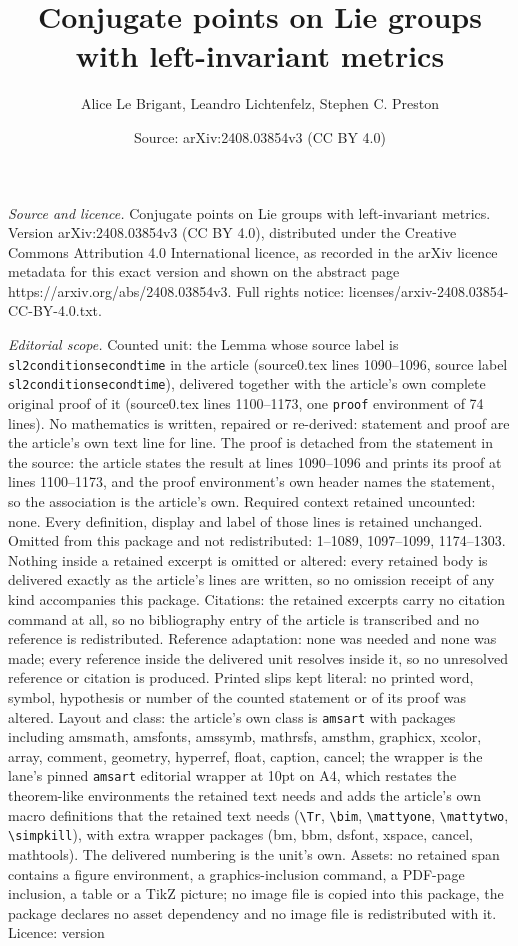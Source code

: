 \documentclass[10pt,a4paper]{amsart}
\title[Conjugate points on Lie groups with left-invariant metrics]{Conjugate points on Lie groups with left-invariant metrics}
\author{Alice Le Brigant, Leandro Lichtenfelz, Stephen C. Preston}
\date{Source: arXiv:2408.03854v3 (CC BY 4.0)}
\begin{document}
\maketitle

\noindent\emph{Source and licence.} Conjugate points on Lie groups with left-invariant metrics. Version arXiv:2408.03854v3 (CC BY 4.0), distributed under the Creative Commons Attribution 4.0 International licence, as recorded in the arXiv licence metadata for this exact version and shown on the abstract page https://arxiv.org/abs/2408.03854v3. Full rights notice: licenses/arxiv-2408.03854-CC-BY-4.0.txt.\par\smallskip

\noindent\textit{Editorial scope.} Counted unit: the Lemma whose source label is \texttt{sl2conditionsecondtime} in the article (source0.tex lines 1090--1096, source label \texttt{sl2conditionsecondtime}), delivered together with the article's own complete original proof of it (source0.tex lines 1100--1173, one \texttt{proof} environment of 74 lines). No mathematics is written, repaired or re-derived: statement and proof are the article's own text line for line. The proof is detached from the statement in the source: the article states the result at lines 1090--1096 and prints its proof at lines 1100--1173, and the proof environment's own header names the statement, so the association is the article's own. Required context retained uncounted: none. Every definition, display and label of those lines is retained unchanged. Omitted from this package and not redistributed: 1--1089, 1097--1099, 1174--1303. Nothing inside a retained excerpt is omitted or altered: every retained body is delivered exactly as the article's lines are written, so no omission receipt of any kind accompanies this package. Citations: the retained excerpts carry no citation command at all, so no bibliography entry of the article is transcribed and no reference is redistributed. Reference adaptation: none was needed and none was made; every reference inside the delivered unit resolves inside it, so no unresolved reference or citation is produced. Printed slips kept literal: no printed word, symbol, hypothesis or number of the counted statement or of its proof was altered. Layout and class: the article's own class is \texttt{amsart} with packages including amsmath, amsfonts, amssymb, mathrsfs, amsthm, graphicx, xcolor, array, comment, geometry, hyperref, float, caption, cancel; the wrapper is the lane's pinned \texttt{amsart} editorial wrapper at 10pt on A4, which restates the theorem-like environments the retained text needs and adds the article's own macro definitions that the retained text needs (\texttt{\textbackslash Tr}, \texttt{\textbackslash bim}, \texttt{\textbackslash mattyone}, \texttt{\textbackslash mattytwo}, \texttt{\textbackslash simpkill}), with extra wrapper packages (bm, bbm, dsfont, xspace, cancel, mathtools). The delivered numbering is the unit's own. Assets: no retained span contains a figure environment, a graphics-inclusion command, a PDF-page inclusion, a table or a TikZ picture; no image file is copied into this package, the package declares no asset dependency and no image file is redistributed with it. Licence: version 
\end{document}
